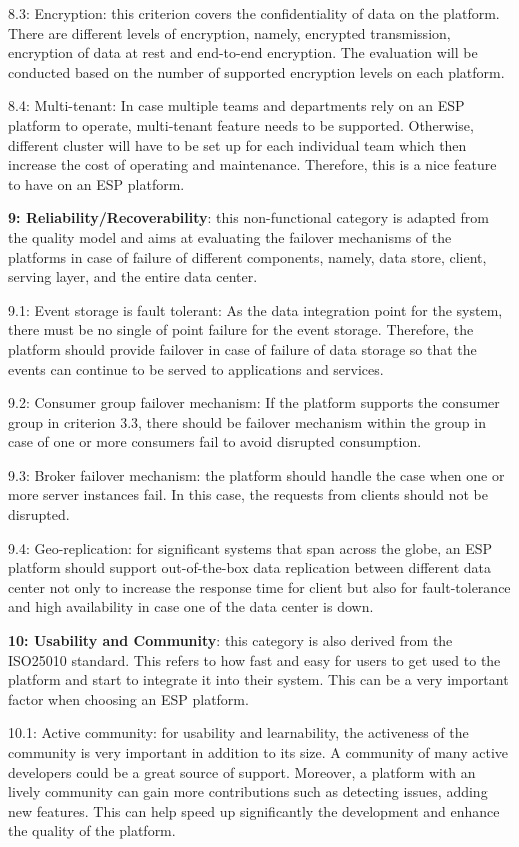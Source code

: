 8.3: Encryption: this criterion covers the confidentiality of data on the platform. There are different levels of encryption, namely, encrypted transmission, encryption of data at rest and end-to-end encryption. The evaluation will be conducted based on the number of supported encryption levels on each platform.

8.4: Multi-tenant: In case multiple teams and departments rely on an ESP platform to operate, multi-tenant feature needs to be supported. Otherwise, different cluster will have to be set up for each individual team which then increase the cost of operating and maintenance. Therefore, this is a nice feature to have on an ESP platform.

\textbf{9: Reliability/Recoverability}: this non-functional category is adapted from the quality model and aims at evaluating the failover mechanisms of the platforms in case of failure of different components, namely, data store, client, serving layer, and the entire data center.

9.1: Event storage is fault tolerant: As the data integration point for the system, there must be no single of point failure for the event storage. Therefore, the platform should provide failover in case of failure of data storage so that the events can continue to be served to applications and services.

9.2: Consumer group failover mechanism: If the platform supports the consumer group in criterion 3.3, there should be failover mechanism within the group in case of one or more consumers fail to avoid disrupted consumption.

9.3: Broker failover mechanism: the platform should handle the case when one or more server instances fail. In this case, the requests from clients should not be disrupted. 

9.4: Geo-replication: for significant systems that span across the globe, an ESP platform should support out-of-the-box data replication between different data center not only to increase the response time for client but also for fault-tolerance and high availability in case one of the data center is down.

\textbf{10: Usability and Community}: this category is also derived from the ISO25010 standard. This refers to how fast and easy for users to get used to the platform and start to integrate it into their system. This can be a very important factor when choosing an ESP platform. 

10.1: Active community: for usability and learnability, the activeness of the community is very important in addition to its size. A community of many active developers could be a great source of support. Moreover, a platform with an lively community can gain more contributions such as detecting issues, adding new features. This can help speed up significantly the development and enhance the quality of the platform.

